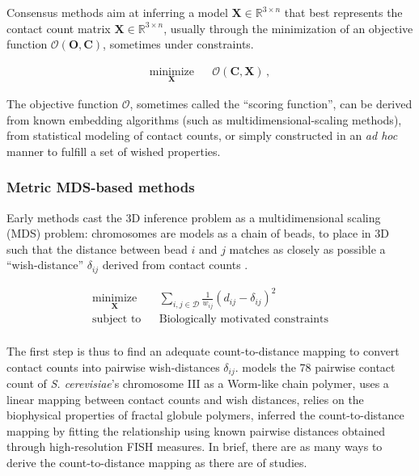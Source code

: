 \documentclass[letterpaper,12pt]{article}
\newcommand{\Xb}{\textbf{X}}
\newcommand{\RR}{\mathbb{R}}
\begin{document}
Consensus methods aim at inferring a model $\mathbf{X} \in \RR^{3 \times n}$
that best represents the contact count matrix $\mathbf{X} \in \RR^{3 \times
n}$, usually through the minimization of an objective function
$\mathcal{O}(\mathbf{O}, \mathbf{C})$, sometimes under constraints.

\begin{equation*}
\renewcommand{\arraystretch}{2}
\begin{array}{ccl}
\underset{\Xb}{\text{minimize}} & & \mathcal{O}(\mathbf{C}, \Xb) \,,
\end{array}
\end{equation*}

The objective function $\mathcal{O}$, sometimes called the ``scoring
function'', can be derived from known embedding algorithms (such as
multidimensional-scaling methods), from statistical modeling of contact
counts, or simply constructed in an \textit{ad hoc} manner to fulfill a set of
wished properties.

\subsubsection*{Metric MDS-based methods}

Early methods cast the 3D inference problem as a
multidimensional scaling (MDS) problem: chromosomes are models as a chain of
beads, to place in 3D such that the distance between bead $i$ and $j$ matches
as closely as possible a ``wish-distance'' $\delta_{ij}$ derived from contact
counts \citep{dekker:capturing, duan:three-dimensional,
tanizawa:mapping, ay:three-dimensional} .

\begin{equation*}
\renewcommand{\arraystretch}{2}
\begin{array}{ccl}
\underset{\Xb}{\text{minimize}} & & \underset{i, j \in \mathcal{D}}{\sum}
\frac{1}{w_{ij}} (d_{ij} - \delta_{ij})^2 \\
\text{subject to} & & \text{Biologically motivated constraints} \\
\end{array}
\end{equation*}


The first step is thus to find an adequate count-to-distance mapping to
convert contact counts into pairwise wish-distances $\delta_{ij}$. 
\citet{dekker:capturing} models the 78 pairwise contact count of {\em S.
cerevisiae}'s chromosome III as a Worm-like chain polymer,
\citet{duan:three-dimensional} uses a linear mapping between contact counts
and wish distances, \citet{ay:three-dimensional} relies on the biophysical
properties of fractal globule polymers, \citet{tanizawa:mapping} inferred the
count-to-distance mapping by fitting the relationship using known pairwise
distances obtained through high-resolution FISH measures. In brief, there are
as many ways to derive the count-to-distance mapping as there are of studies.
\end{document}
